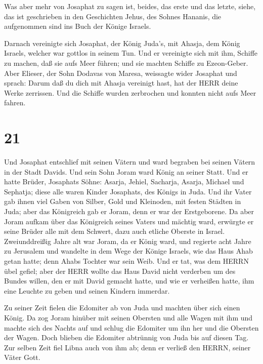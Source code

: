  Was aber mehr von Josaphat zu sagen ist, beides, das erste
und das letzte, siehe, das ist geschrieben in den Geschichten Jehus, des
Sohnes Hananis, die aufgenommen sind ins Buch der Könige Israels.

 Darnach vereinigte sich Josaphat, der König Juda's, mit
Ahasja, dem König Israels, welcher war gottlos in seinem Tun.
 Und er vereinigte sich mit ihm, Schiffe zu machen, daß sie
aufs Meer führen; und sie machten Schiffe zu Ezeon-Geber. 
Aber Elieser, der Sohn Dodavas von Maresa, weissagte wider Josaphat und
sprach: Darum daß du dich mit Ahasja vereinigt hast, hat der HERR deine
Werke zerrissen. Und die Schiffe wurden zerbrochen und konnten nicht
aufs Meer fahren.

\hypertarget{section-20}{%
\section{21}\label{section-20}}

 Und Josaphat entschlief mit seinen Vätern und ward begraben
bei seinen Vätern in der Stadt Davids. Und sein Sohn Joram ward König an
seiner Statt.  Und er hatte Brüder, Josaphats Söhne: Asarja,
Jehiel, Sacharja, Asarja, Michael und Sephatja; diese alle waren Kinder
Josaphats, des Königs in Juda.  Und ihr Vater gab ihnen viel
Gaben von Silber, Gold und Kleinoden, mit festen Städten in Juda; aber
das Königreich gab er Joram, denn er war der Erstgeborene. 
Da aber Joram aufkam über das Königreich seines Vaters und mächtig ward,
erwürgte er seine Brüder alle mit dem Schwert, dazu auch etliche Oberste
in Israel.  Zweiunddreißig Jahre alt war Joram, da er König
ward, und regierte acht Jahre zu Jerusalem  und wandelte in
dem Wege der Könige Israels, wie das Haus Ahab getan hatte; denn Ahabs
Tochter war sein Weib. Und er tat, was dem HERRN übel gefiel;
 aber der HERR wollte das Haus David nicht verderben um des
Bundes willen, den er mit David gemacht hatte, und wie er verheißen
hatte, ihm eine Leuchte zu geben und seinen Kindern immerdar.

 Zu seiner Zeit fielen die Edomiter ab von Juda und machten
über sich einen König.  Da zog Joram hinüber mit seinen
Obersten und alle Wagen mit ihm und machte sich des Nachts auf und
schlug die Edomiter um ihn her und die Obersten der Wagen. 
Doch blieben die Edomiter abtrünnig von Juda bis auf diesen Tag. Zur
selben Zeit fiel Libna auch von ihm ab; denn er verließ den HERRN,
seiner Väter Gott.

